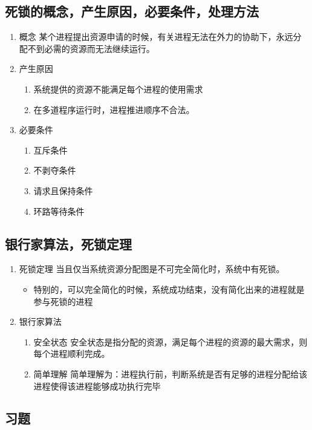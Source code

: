 \documentclass[11pt]{article}
\begin{document}
\subsection{死锁的概念，产生原因，必要条件，处理方法}
\label{sec-2-13}
\begin{enumerate}
\item 概念
\label{sec-2-13-0-1}
某个进程提出资源申请的时候，有关进程无法在外力的协助下，永远分配不到必需的资源而无法继续运行。
\item 产生原因
\label{sec-2-13-0-2}
\begin{enumerate}
\item 系统提供的资源不能满足每个进程的使用需求
\item 在多道程序运行时，进程推进顺序不合法。
\end{enumerate}
\item 必要条件
\label{sec-2-13-0-3}
\begin{enumerate}
\item 互斥条件
\item 不剥夺条件
\item 请求且保持条件
\item 环路等待条件
\end{enumerate}
\end{enumerate}

\subsection{银行家算法，死锁定理}
\label{sec-2-14}
\begin{enumerate}
\item 死锁定理
\label{sec-2-14-0-1}
当且仅当系统资源分配图是不可完全简化时，系统中有死锁。
\begin{itemize}
\item 特别的，可以完全简化的时候，系统成功结束，没有简化出来的进程就是参与死锁的进程
\end{itemize}
\item 银行家算法
\label{sec-2-14-0-2}
\begin{enumerate}
\item 安全状态
\label{sec-2-14-0-2-1}
安全状态是指分配的资源，满足每个进程的资源的最大需求，则每个进程顺利完成。
\item 简单理解
\label{sec-2-14-0-2-2}
简单理解为：进程执行前，判断系统是否有足够的进程分配给该进程使得该进程能够成功执行完毕
\end{enumerate}
\end{enumerate}
\subsection{习题}
\label{sec-2-15}
\end{document}
